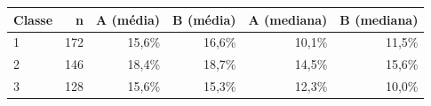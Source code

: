 \begin{tabular}{lrrrrr}
\toprule
Classe & n & A (média) & B (média) & A (mediana) & B (mediana) \\
\midrule
1 & 172 & 15,6\% & 16,6\% & 10,1\% & 11,5\% \\
2 & 146 & 18,4\% & 18,7\% & 14,5\% & 15,6\% \\
3 & 128 & 15,6\% & 15,3\% & 12,3\% & 10,0\% \\
\bottomrule
\end{tabular}
